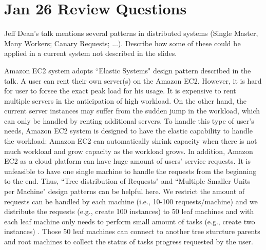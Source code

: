 \section{Jan 26 Review Questions}
\begin{QandA}
   \item Jeff Dean's talk mentions several patterns in distributed systems (Single Master, Many Workers; Canary Requests; ...). Describe how some of these could be applied in a current system not described in the slides.
         \begin{answered}
         Amazon EC2 system adopts ``Elastic Systems" design pattern described in the talk. A user can rent their own server(s) on the Amazon EC2. However, it is hard for user to forsee the exact peak load for his usage.
         It is expensive to rent multiple servers in the anticipation of high workload. On the other hand, the current server instances may suffer from the sudden jump in the workload, which can only be handled by renting
         additional servers. To handle this type of user's needs, Amazon EC2 system is designed to have the elastic capability to handle the workload: Amazon EC2 can automatically shrink capacity when there is not much workload and grow capacity as the workload grows. In addition, Amazon EC2 as a cloud platform can have huge amount of users' service requests. It is unfeasible to have one single machine to handle the requests from the beginning to the end. Thus, ``Tree distribution of Requests" and ``Multiple Smaller Units per Machine" design patterns can be helpful here. We restrict the amount of requests can be handled by each machine (i.e., 10-100 requests/machine) and we distribute the requests (e.g., 
         create 100 instances) to 50 leaf machines and with each leaf machine only needs to perform small amount of tasks (e.g., create two instances) . Those 50 leaf machines can connect to another tree sturcture parents and root machines to collect the status of tasks progress requested by the user.
         \end{answered}


\end{QandA}
